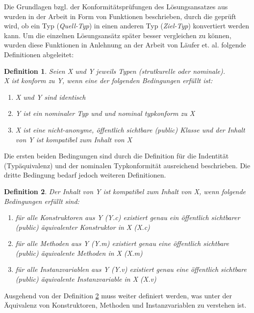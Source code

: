 \documentclass[11pt, 
ngerman,
doublespacing,
chapterinoneline, %
consistentlayout, %
]{scrartcl}
\newtheorem{definition}{Definition}
\begin{document}
Die Grundlagen bzgl. der Konformitätsprüfungen des Lösungsansatzes aus \cite{whiteoak} wurden in der Arbeit in Form von Funktionen beschrieben, durch die geprüft wird, ob ein Typ (\emph{Quell-Typ}) in einen anderen Typ (\emph{Ziel-Typ}) konvertiert werden kann. Um die einzelnen Lösungsansätz später besser vergleichen zu können, wurden diese Funktionen in Anlehnung an der Arbeit von Läufer et. al. \cite{structconfjava} folgende Definitionen abgeleitet:
\begin{definition}\label{def_allgTypkonfWHITEOAK}
Seien \emph{X} und \emph{Y} jeweils Typen (strutkurelle oder nominale).\\
\emph{X} ist konform zu \emph{Y}, wenn eine der folgenden Bedingungen erfüllt ist:
\begin{enumerate}
\item \emph{X} und \emph{Y} sind identisch
\item \emph{Y} ist ein nominaler Typ und und nominal typkonform zu \emph{X} 
\item \emph{X} ist eine nicht-anonyme, öffentlich sichtbare (public) Klasse und der Inhalt von \emph{Y} ist kompatibel zum Inhalt von \emph{X} 
\end{enumerate}
\end{definition}
Die ersten beiden Bedingungen sind durch die Definition für die Indentität (Typäquivalenz) und der nominalen Typkonformität ausreichend beschrieben. Die dritte Bedingung bedarf jedoch weiteren Definitionen.
\begin{definition}\label{def_compatibleTypesWHITEOAK}
Der Inhalt von \emph{Y} ist kompatibel zum Inhalt von \emph{X}, wenn folgende Bedingungen erfüllt sind:
\begin{enumerate}
\item für alle Konstruktoren aus \emph{Y} (\emph{Y.c}) existiert genau ein öffentlich sichtbarer (public) äquivalenter Konstruktor in \emph{X} (\emph{X.c})
\item für alle Methoden aus \emph{Y} (\emph{Y.m}) existiert genau eine öffentlich sichtbare (public) äquivalente Methoden in \emph{X} (\emph{X.m})
\item für alle Instanzvariablen aus \emph{Y} (\emph{Y.v}) existiert genau eine öffentlich sichtbare (public) äquivalente Instanzvariable in \emph{X} (\emph{X.v})
\end{enumerate}
\end{definition}
Ausgehend von der Definition \ref{def_compatibleTypesWHITEOAK} muss weiter definiert werden, was unter der Äquivalenz von Konstruktoren, Methoden und Instanzvariablen zu verstehen ist.
\end{document}
